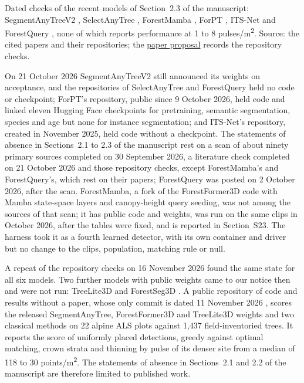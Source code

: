 \documentclass[10pt,a4paper]{article}
\makeatletter
\newcommand\suppFloatBarrier{\par\addpenalty\z@
  \ifx\@deferlist\@empty\else\expandafter\supp@flush\fi}
\newcommand\supp@flush{\let\supp@waiting\@deferlist
  \newpage
  \ifx\@deferlist\supp@waiting\null\newpage\fi
  \ifx\@deferlist\supp@waiting\expandafter\clearpage\else\expandafter\suppFloatBarrier\fi}
\gdef\supp@afterheading{}
\renewcommand\section{\suppFloatBarrier
    \gdef\supp@afterheading{\suppressfloats[t]\gdef\supp@afterheading{}}\supp@section}}
\makeatother
\begin{document}
\section*{S24. Repository checks of recent models}

Dated checks of the recent models of Section~2.3 of the manuscript:
SegmentAnyTreeV2 \citep{wielgosz2026segmentanytreev2}, SelectAnyTree
\citep{nguyen2026selectanytree}, ForestMamba \citep{nguyen2026forestmamba}, ForPT
\citep{yue2026toward}, ITS-Net \citep{li2026itsnet} and ForestQuery
\citep{zhan2026forestquery}, none of which reports performance at 1 to 8 pulses/m\textsuperscript{2}.
Source: the cited papers and their repositories; the \href{https://github.com/devakellc/lidar-tree-benchmark/blob/main/docs/paper-proposal.md}{paper
proposal} records the repository checks.

On 21 October 2026 SegmentAnyTreeV2 still announced its weights on acceptance,
and the repositories of SelectAnyTree and ForestQuery held no code or
checkpoint; ForPT's repository, public since 9 October 2026, held code and
linked eleven Hugging Face checkpoints for pretraining, semantic segmentation,
species and age but none for instance segmentation; and ITS-Net's repository,
created in November 2025, held code without a checkpoint. The statements of
absence in Sections~2.1 to 2.3 of the manuscript rest on a scan of about ninety
primary sources completed on 30 September 2026, a literature check completed on
21 October 2026 and those repository checks, except ForestMamba's and
ForestQuery's, which rest on their papers; ForestQuery was posted on 2 October
2026, after the scan. ForestMamba, a fork of the ForestFormer3D code with Mamba
state-space layers and canopy-height query seeding, was not among the sources of
that scan; it has public code and weights, was run on the same clips in October
2026, after the tables were fixed, and is reported in Section~S23. The harness
took it as a fourth learned detector, with its own container and driver but no
change to the clips, population, matching rule or null.

A repeat of the repository checks on 16 November 2026 found the same state for
all six models. Two further models with public weights came to our notice then
and were not run: TreeLite3D \citep{rizaldy2026labelefficient} and ForestSeg3D
\citep{zhang2026forestseg3d}. A public repository of code and results without a
paper, whose only commit is dated 11 November 2026
\citep{mallacampoverde2026pretrained}, scores the released SegmentAnyTree,
ForestFormer3D and TreeLite3D weights and two classical methods on 22 alpine ALS
plots against 1,437 field-inventoried trees. It reports the score of uniformly
placed detections, greedy against optimal matching, crown strata and thinning by
pulse of its denser site from a median of 118 to 30 points/m\textsuperscript{2}. The statements of
absence in Sections~2.1 and 2.2 of the manuscript are therefore limited to
published work.
\end{document}
